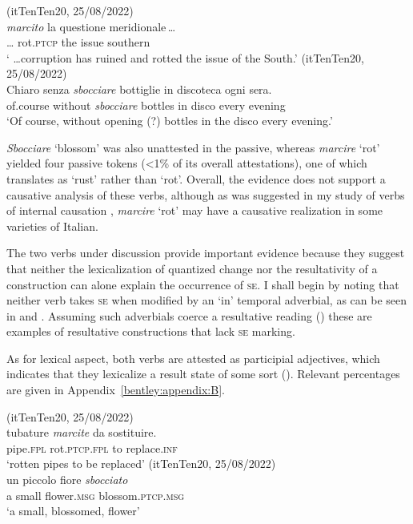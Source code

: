 \documentclass[output=paper,colorlinks,citecolor=brown
]{langscibook}
\begin{document}
\ea \label{bentley_example_16}(itTenTen20, 25/08/2022)\\
     \textit{marcito}	la			questione	{meridionale\,\ldots{}}\\
         {\ldots}                                               rot.\textsc{ptcp}		the		issue					southern\\
    \glt ‘ \ldots  corruption has ruined and rotted the issue of the South.’
\ex \label{bentley_example_17}(itTenTen20, 25/08/2022)\\
    \gll Chiaro 			senza			\textit{sbocciare} bottiglie	in	discoteca		ogni		sera.  \\
         of.course		without	\textit{sbocciare}	bottles			in disco					every evening \\
    \glt ‘Of course, without opening (?) bottles in the disco every evening.’
\z\largerpage[2]

\textit{Sbocciare} ‘blossom’ was also unattested in the passive, whereas \textit{marcire} ‘rot’ yielded four passive tokens (<1\% of its overall attestations), one of which translates as ‘rust’ rather than ‘rot’. Overall, the evidence does not support a causative analysis of these verbs, although as was suggested in my study of verbs of internal causation \citep{bentley2023internally}, \textit{marcire} ‘rot’ may have a causative realization in some varieties of Italian.

The two verbs under discussion provide important evidence because they suggest that neither the lexicalization of quantized change nor the resultativity of a construction can alone explain the occurrence of \textsc{se}. I shall begin by noting that neither verb takes \textsc{se} when modified by an ‘in’ temporal adverbial, as can be seen in  and . Assuming such adverbials coerce a resultative reading (\cites[332--336]{dowty1979word}{hay1999scalar}) these are examples of resultative constructions that lack \textsc{se} marking.

As for lexical aspect, both verbs are attested as participial adjectives, which indicates that they lexicalize a result state of some sort (\cites[]{hout2004unaccusativity}[355]{bentley2006split}[283--284]{legendre2017auxiliaries}). Relevant percentages are given in Appendix~\ref{bentley:appendix:B}.\largerpage

\ea \label{bentley_example_18}(itTenTen20, 25/08/2022)\\
    \gll tubature		\textit{marcite}					da 	sostituire.   \\
    pipe.\textsc{fpl}	rot.\textsc{ptcp}.\textsc{fpl}	to		replace.\textsc{inf}		 \\
    \glt ‘rotten pipes to be replaced’
\pagebreak
\ex \label{bentley_example_19}(itTenTen20, 25/08/2022)\\
    \gll un	piccolo	fiore						\textit{sbocciato}   \\
    a			small			flower.\textsc{msg}	blossom.\textsc{ptcp}.\textsc{msg}	 \\
    \glt ‘a small, blossomed, flower’
\z
\end{document}
